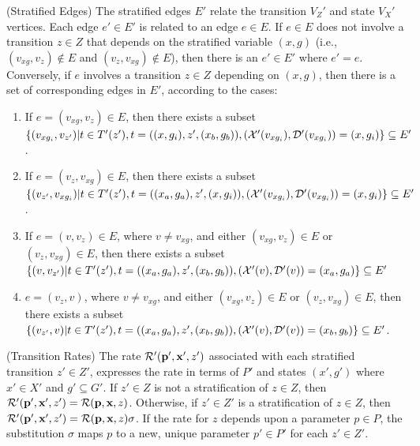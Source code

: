 \begin{definition} (Stratified Edges)
	The stratified edges $E'$ relate the transition $V_Z'$ and state $V_X'$ vertices.  Each edge $e' \in E'$ is related to an edge $e \in E$.  If $e\in E$ does not involve a transition $z \in Z$ that depends on the stratified variable $(x, g)$ (i.e., $(v_{xg}, v_z) \not\in E$ and $(v_z, v_{xg}) \not\in E$), then there is an $e'\in E'$ where $e'=e$.  Conversely, if $e$ involves a transition $z \in Z$ depending on $(x, g)$, then there is a set of corresponding edges in $E'$, according to the cases:
	\begin{enumerate}
		\item If $e = (v_{xg}, v_z) \in E$, then there exists a subset $\{(v_{xg_i}, v_{z'}) | t \in T'(z'), t = ((x, g_i), z', (x_b, g_b)), ({\cal X}'(v_{xg_i}),{\cal D}'(v_{xg_i})) = (x, g_i)\} \subseteq E'$.
		\item If $e = (v_z, v_{xg}) \in E$, then there exists a subset $\{( v_{z'}, v_{xg_i}) | t \in T'(z'), t = ((x_a, g_a), z', (x, g_i)), ({\cal X}'(v_{xg_i}), {\cal D}'(v_{xg_i})) = (x, g_i)\} \subseteq E'$.
		\item If $e = (v, v_z) \in E$, where $v \not= v_{xg}$, and either $(v_{xg}, v_z) \in E$ or $(v_z, v_{xg}) \in E$, then there exists a subset $\{(v, v_{z'}) | t \in T'(z'), t = ((x_a, g_a), z', (x_b, g_b)), ({\cal X}'(v), {\cal D}'(v)) = (x_a, g_a)\} \subseteq E'$
		\item $e = (v_z, v)$, where $v \not= v_{xg}$, and either $(v_{xg}, v_z) \in E$ or $(v_z, v_{xg}) \in E$, then there exists a subset $\{( v_{z'}, v) | t \in T'(z'), t = ((x_a, g_a), z', (x_b, g_b)), ({\cal X}'(v), {\cal D}'(v)) = (x_b, g_b)\} \subseteq E'$.
	\end{enumerate}
\end{definition}

\begin{definition} (Transition Rates)
	The rate ${\cal R}'({\bf p}', {\bf x}', z')$ associated with each stratified transition $z'\in Z'$, expresses the rate in terms of $P'$ and states $(x', g')$ where $x'\in X'$ and $g' \subseteq G'$.  If $z'\in Z$ is not a stratification of $z\in Z$, then ${\cal R}'({\bf p}', {\bf x}', z') = {\cal R}({\bf p}, {\bf x}, z)$.  Otherwise, if $z'\in Z'$ is a stratification of $z\in Z$, then ${\cal R}'({\bf p}', {\bf x}', z') = {\cal R}({\bf p}, {\bf x}, z)\sigma$.  If the rate for $z$ depends upon a parameter $p\in P$, the substitution $\sigma$ maps $p$ to a new, unique parameter $p' \in P'$ for each $z'\in Z'$.
\end{definition}

